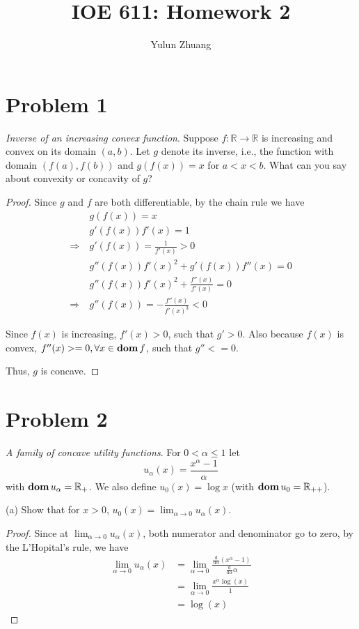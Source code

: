 \documentclass[11pt]{article}
\newcommand{\dd}{\mathrm{d}}
\newcommand{\RR}{\mathbb{R}}
\begin{document}
\title{IOE 611: Homework 2}
\author{Yulun Zhuang}
\maketitle
\section*{Problem 1}
\textit{Inverse of an increasing convex function}. Suppose $f : \RR \rightarrow \RR$ is increasing and convex on its domain $(a, b)$. Let $g$ denote its inverse, i.e., the function with domain $(f(a), f(b))$ and $g(f(x)) = x$ for $a < x < b$. What can you say about convexity or concavity of $g$?

\begin{proof}
  Since $g$ and $f$ are both differentiable, by the chain rule we have
  \begin{align*}
    &g(f(x)) = x\\
    &g'(f(x))f'(x) = 1\\
    \Rightarrow~&g'(f(x)) = \frac{1}{f'(x)} > 0\\
    &g''(f(x))f'(x)^2 + g'(f(x))f''(x) = 0\\
    &g''(f(x))f'(x)^2 + \frac{f''(x)}{f'(x)} = 0\\
    \Rightarrow~& g''(f(x)) = - \frac{f''(x)}{f'(x)^3} < 0
  \end{align*}

  Since $f(x)$ is increasing, $f'(x)>0$, such that $g'>0$. Also because $f(x)$ is convex, $f''(x)>=0, \forall x\in \mathop{\textbf{dom}} f$, such that $g''<=0$. 
  
  Thus, $g$ is concave.
\end{proof}


\clearpage
\section*{Problem 2}
\textit{A family of concave utility functions}. For $0 < \alpha \leq 1$ let 
\[
u_\alpha(x) = \frac{x^\alpha - 1}{\alpha}
\]
with $\dom u_\alpha = \RR_+$. We also define $u_0(x) = \log x$ (with $\dom u_0 = \RR_{++}$).

(a) Show that for $x>0$, $u_0(x) = \lim_{\alpha \rightarrow 0} u_\alpha(x)$.
\begin{proof}
  Since at $\lim_{\alpha\rightarrow0} u_\alpha(x)$, both numerator and denominator go to zero, by the L'Hopital's rule, we have
  \begin{align*}
    \lim_{\alpha\rightarrow0} u_\alpha(x) 
    &=
    \lim_{\alpha\rightarrow0} \frac{\frac{\dd}{\dd\alpha}(x^\alpha - 1)}{\frac{\dd}{\dd\alpha}\alpha}\\
    &=
    \lim_{\alpha\rightarrow0} \frac{x^\alpha\log(x)}{1}\\
    &=
    \log(x)
  \end{align*}
\end{proof}
\end{document}
